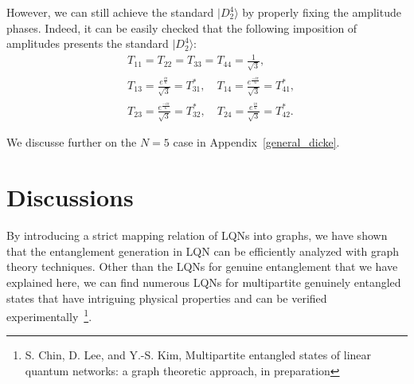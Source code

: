 \documentclass[a4paper,twocolumn,8pt,accepted=2021-12-15]{quantumarticle}
\newcommand{\nn}{\nonumber}
\def\th{\theta}
\def\>{\rangle}
\def\dc{{\overline{G}_d }}
\begin{document}
	However, we can still achieve the standard $|D_2^4\>$ by properly fixing the amplitude phases. Indeed, it can be easily checked that the following imposition of amplitudes presents the standard $|D_2^4\>$:
	\begin{align}
		&T_{11} =T_{22}=T_{33}=T_{44}=\frac{1}{\sqrt{3}}, \nn \\
		&T_{13} = \frac{e^{\frac{i\pi}{6}}}{\sqrt{3}}=T_{31}^*,\quad  T_{14} = \frac{e^{\frac{-i\pi}{6}}}{\sqrt{3}}= T_{41}^*, \nn \\
		& T_{23} = \frac{e^{\frac{-i\pi}{6}}}{\sqrt{3}}= T_{32}^*,\quad T_{24} = \frac{e^{\frac{i\pi}{6}}}{\sqrt{3}}= T_{42}^*.
	\end{align}	
	
	We discusse further on the $N=5$ case in Appendix~\ref{general_dicke}.
	
	\section{Discussions}\label{discussion}
	By introducing a strict mapping relation of LQNs into graphs, we have shown that the entanglement generation in LQN can be efficiently analyzed with graph theory techniques. Other than the LQNs for genuine entanglement that we have explained here, we can find numerous LQNs for multipartite genuinely entangled states that have intriguing physical properties and can be verified experimentally~\footnote{S. Chin, D. Lee, and Y.-S. Kim, Multipartite entangled states of linear quantum networks: a graph theoretic approach, in preparation}. 
	
\end{document}
